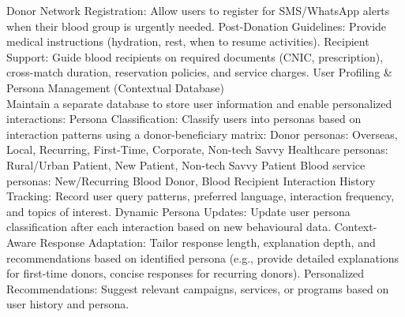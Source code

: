 \begin{outline}
  \3 Donor Network Registration: Allow users to register for SMS/WhatsApp alerts when their blood group is urgently needed. 
  \3 Post-Donation Guidelines: Provide medical instructions (hydration, rest, when to resume activities). 
  \3 Recipient Support: Guide blood recipients on required documents (CNIC, prescription), cross-match duration, reservation policies, and service charges. 
  \2 User Profiling \& Persona Management (Contextual Database) \\
  Maintain a separate database to store user information and enable personalized interactions: 
  \3 Persona Classification: Classify users into personas based on interaction patterns using a donor-beneficiary matrix:  
  \4 Donor personas: Overseas, Local, Recurring, First-Time, Corporate, Non-tech Savvy 
  \4 Healthcare personas: Rural/Urban Patient, New Patient, Non-tech Savvy Patient 
  \4 Blood service personas: New/Recurring Blood Donor, Blood Recipient 
  \3 Interaction History Tracking: Record user query patterns, preferred language, interaction frequency, and topics of interest. 
  \3 Dynamic Persona Updates: Update user persona classification after each interaction based on new behavioural data. 
  \3 Context-Aware Response Adaptation: Tailor response length, explanation depth, and recommendations based on identified persona (e.g., provide detailed explanations for first-time donors, concise responses for recurring donors).
  \3 Personalized Recommendations: Suggest relevant campaigns, services, or programs based on user history and persona. 
 

\end{outline}
